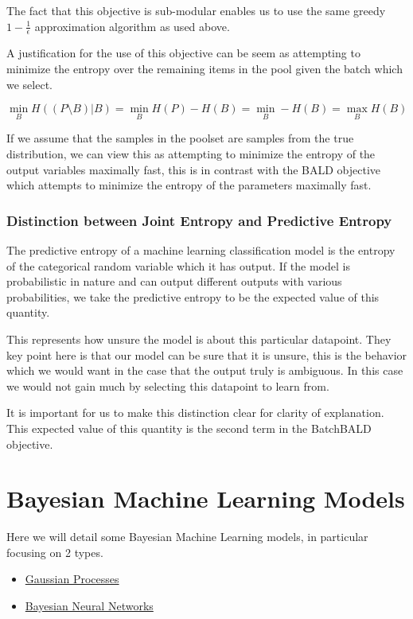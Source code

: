 \documentclass[12pt, a4paper]{report}
\theoremstyle{definition}
\theoremstyle{definition}
\theoremstyle{definition}
\begin{document}
The fact that this objective is sub-modular enables us to use the same greedy $1 - \frac{1}{\epsilon}$ approximation algorithm as used above.

A justification for the use of this objective can be seem as attempting to minimize the entropy over the remaining items in the pool given the batch which we select.


$$\min_{B} H( \left(P \setminus B\right) | B) = \min_{B} H(P) - H(B) = \min_{B} - H(B) = \max_B H(B)$$

If we assume that the samples in the poolset are samples from the true distribution, we can view this as attempting to minimize the entropy of the output variables maximally fast, this is in contrast with the BALD objective which attempts to minimize the entropy of the parameters maximally fast.

\subsection{Distinction between Joint Entropy and Predictive Entropy}

The predictive entropy of a machine learning classification model is the entropy of the categorical random variable which it has output. If the model is probabilistic in nature and can output different outputs with various probabilities, we take the predictive entropy to be the expected value of this quantity.

This represents how unsure the model is about this particular datapoint. They key point here is that our model can be sure that it is unsure, this is the behavior which we would want in the case that the output truly is ambiguous. In this case we would not gain much by selecting this datapoint to learn from. 

It is important for us to make this distinction clear for clarity of explanation. This expected value of this quantity is the second term in the BatchBALD objective.


\chapter{Bayesian Machine Learning Models}
\label{sec:Models}


Here we will detail some Bayesian Machine Learning models, in particular focusing on 2 types.

\begin{itemize}
    \item \hyperref[sec:GaussianProcesses]{Gaussian Processes}
    \item \hyperref[sec:BNNs]{Bayesian Neural Networks}
\end{itemize}
\end{document}
